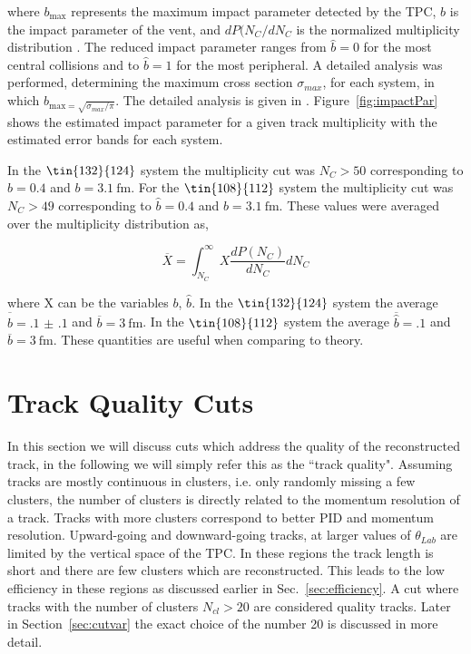 where $b_{\mathrm{max}}$ represents the maximum impact parameter detected by the TPC, $b$ is the impact parameter of the vent,  and $dP(N_C/dN_C$ is the normalized multiplicity distribution \cite{reducedimpact}. The reduced impact parameter ranges from $\hat{b}=0$ for the most central collisions and to $\hat{b}=1$ for the most peripheral. A  detailed analysis was performed, determining the maximum cross section $\sigma_{max}$, for each system, in which $b_{\mathrm{max} = \sqrt{\sigma_{max}/\pi}}$. The detailed analysis is given in \cite{jon}. Figure~\ref{fig:impactPar} shows the estimated impact parameter for a given track multiplicity with the estimated error bands for each system. 

In the $\tin{132}{124}$ system the multiplicity cut was $N_C > 50$ corresponding to $\hat{b} = 0.4$ and $b = \SI{3.1}{\femto\metre}$. For the $\tin{108}{112}$ system the multiplicity cut was $N_C > 49$ corresponding to $\hat{b} = 0.4$ and $b = \SI{3.1}{\femto\metre}$. These values were averaged over the multiplicity distribution as,

\begin{equation}
 \overline{X} = \int_{N_C}^{\infty} X\frac{dP(N_C)}{dN_C} dN_C
\end{equation}

where X can be the variables $b$, $\hat{b}$. In the $\tin{132}{124}$ system the average $\overline{\hat{b}} = \num{.1(1)}$ and $\overline{b} = \SI{3}{\femto\metre}$. In the $\tin{108}{112}$ system the average $\overline{\hat{b}} = .1$ and $\overline{b} = \SI{3}{\femto\metre}$. These quantities are useful when comparing to theory. 

\section{Track Quality Cuts}
In this section we will discuss cuts which address the quality of the reconstructed track, in the following we will simply refer this as the ``track quality". Assuming tracks are mostly continuous in clusters, i.e. only randomly missing a few clusters, the number of clusters is directly related to the momentum resolution of a track. Tracks with more clusters correspond to better PID and momentum resolution. Upward-going and downward-going tracks, at larger values of $\theta_{Lab}$ are limited by the vertical space of the TPC. In these regions the track length is short and there are few clusters which are reconstructed. This leads to the low efficiency in these regions as discussed earlier in Sec.~\ref{sec:efficiency}. A cut where tracks with the number of clusters $N_{cl} > 20$ are considered quality tracks. Later in Section~\ref{sec:cutvar} the exact choice of the number 20 is discussed in more detail.

